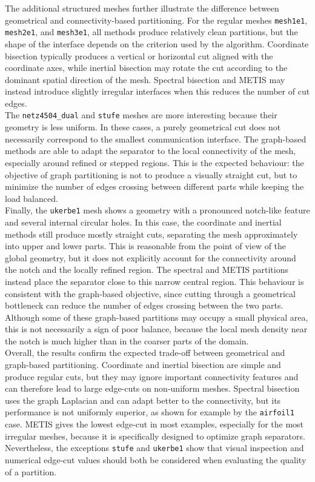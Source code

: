 \documentclass[unicode,10pt,a4paper,oneside,numbers=endperiod,openany]{scrartcl}
\begin{document}
The additional structured meshes further illustrate the difference between geometrical and
connectivity-based partitioning. For the regular meshes \texttt{mesh1e1}, \texttt{mesh2e1}, and
\texttt{mesh3e1}, all methods produce relatively clean partitions, but the shape of the interface
depends on the criterion used by the algorithm. Coordinate bisection typically produces a vertical
or horizontal cut aligned with the coordinate axes, while inertial bisection may rotate the cut
according to the dominant spatial direction of the mesh. Spectral bisection and METIS may instead
introduce slightly irregular interfaces when this reduces the number of cut edges.\\

The \texttt{netz4504\_dual} and \texttt{stufe} meshes are more interesting because their geometry is
less uniform. In these cases, a purely geometrical cut does not necessarily correspond to the
smallest communication interface. The graph-based methods are able to adapt the separator to
the local connectivity of the mesh, especially around refined or stepped regions. This is the
expected behaviour: the objective of graph partitioning is not to produce a visually straight cut,
but to minimize the number of edges crossing between different parts while keeping the load
balanced.\\

Finally, the \texttt{ukerbe1} mesh shows a geometry with a pronounced notch-like feature and
several internal circular holes. In this case, the coordinate and inertial methods still produce
mostly straight cuts, separating the mesh approximately into upper and lower parts. This is
reasonable from the point of view of the global geometry, but it does not explicitly account for
the connectivity around the notch and the locally refined region. The spectral and METIS
partitions instead place the separator close to this narrow central region. This behaviour is
consistent with the graph-based objective, since cutting through a geometrical bottleneck can
reduce the number of edges crossing between the two parts. Although some of these graph-based
partitions may occupy a small physical area, this is not necessarily a sign of poor balance, because
the local mesh density near the notch is much higher than in the coarser parts of the domain.\\

Overall, the results confirm the expected trade-off between geometrical and graph-based
partitioning. Coordinate and inertial bisection are simple and produce regular cuts, but they may
ignore important connectivity features and can therefore lead to large edge-cuts on non-uniform
meshes. Spectral bisection uses the graph Laplacian and can adapt better to the connectivity, but
its performance is not uniformly superior, as shown for example by the \texttt{airfoil1} case.
METIS gives the lowest edge-cut in most examples, especially for the most irregular meshes, because
it is specifically designed to optimize graph separators. Nevertheless, the exceptions
\texttt{stufe} and \texttt{ukerbe1} show that visual inspection and numerical edge-cut values should
both be considered when evaluating the quality of a partition.
\end{document}

